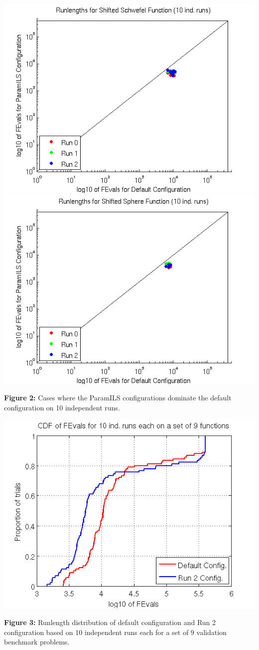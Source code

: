 \begin{center}
\hfill \includegraphics[scale=0.45]{scatterSchwefel.png} \quad \includegraphics[scale=0.45]{scatterSphere.png} \hfill
\end{center}
\textbf{Figure 2:} Cases where the ParamILS configurations dominate the default configuration on 10 independent runs.\\

\begin{center}
\includegraphics[scale=0.5]{CDFPlot.png}
\end{center}	
\textbf{Figure 3:} Runlength distribution of default configuration and Run 2 configuration based on 10 independent runs each for a set of 9 validation benchmark problems.